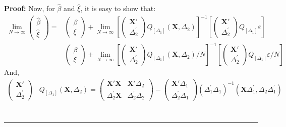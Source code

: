 \documentclass[12pt]{article}
\newenvironment{proof}[1][Proof]{\noindent\textbf{#1:} }{\  \rule{0.5em}{0.5em}}
\begin{document}
\begin{proof}
Now, for $\hat{\beta}$ and $\hat{\xi}$, it is easy to show that:
\begin{align*}
\lim_{N \rightarrow \infty} \begin{pmatrix}
\hat{\beta} \\
\hat{\xi}
\end{pmatrix}  = & \begin{pmatrix}
\beta \\
\xi
\end{pmatrix}  + \lim_{N \rightarrow \infty}\left[\begin{pmatrix}
\mathbf{X}'\\
\Delta_{2}^{'}
\end{pmatrix} Q_{[\Delta_1]} (\mathbf{X}, \Delta_{2})\right]^{-1}\left[\begin{pmatrix}
\mathbf{X}'\\
\Delta_{2}^{'}
\end{pmatrix} Q_{[\Delta_1]} \varepsilon \right] \\
& \begin{pmatrix}
\beta \\
\xi
\end{pmatrix}  + \lim_{N \rightarrow \infty}\left[\begin{pmatrix}
\mathbf{X}'\\
\Delta_{2}^{'}
\end{pmatrix} Q_{[\Delta_1]} (\mathbf{X}, \Delta_{2}) / N \right]^{-1}\left[\begin{pmatrix}
\mathbf{X}'\\
\Delta_{2}^{'}
\end{pmatrix} Q_{[\Delta_1]} \varepsilon / N \right] 
\end{align*}
And,
\begin{align*}
\begin{pmatrix}
\mathbf{X}'\\
\Delta_{2}^{'}
\end{pmatrix} & Q_{[\Delta_1]} (\mathbf{X}, \Delta_{2}) = \begin{pmatrix}
\mathbf{X}'\mathbf{X} & \mathbf{X}'\Delta_{2} \\
\Delta_{2}^{'}\mathbf{X} & \Delta_{2}^{'}\Delta_{2}
\end{pmatrix} - 
\begin{pmatrix}
\mathbf{X}'\Delta_{1} \\
\Delta_{2}^{'}\Delta_{1}
\end{pmatrix} \left(\Delta_{1}^{'}\Delta_{1}\right)^{-1} (\mathbf{X}\Delta_{1}^{'}, \Delta_{2}\Delta_{1}^{'}) \\

\end{align*}
\end{proof}
\end{document}

